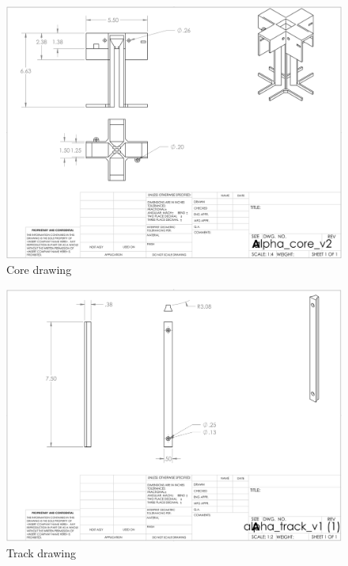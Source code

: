 \begin{figure}[H]
    \centering
    \includegraphics[width=\textwidth]{src/figs/cad-and-dwgs/core_dwg.png}
    \caption{Core drawing}
    \label{cad:core:dwg}
\end{figure}

\begin{figure}[H]
    \centering
    \includegraphics[width=\textwidth]{src/figs/cad-and-dwgs/track_dwg.png}
    \caption{Track drawing}
    \label{cad:track:dwg}
\end{figure}












